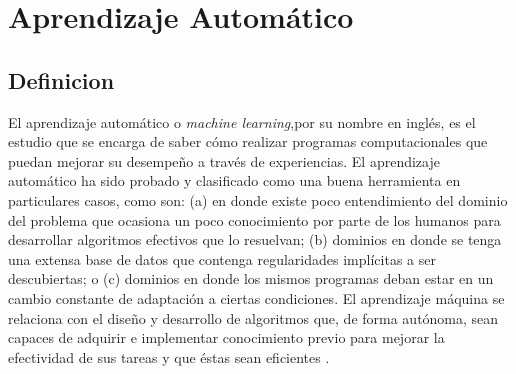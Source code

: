 \section{Aprendizaje Automático}

\subsection{Definicion}

El aprendizaje automático o \textit{machine learning},por su nombre en inglés, es el estudio que se encarga de saber cómo realizar programas computacionales que puedan mejorar su desempeño a través de experiencias. El aprendizaje automático ha sido probado y clasificado como una buena herramienta en particulares casos, como son: (a) en donde existe poco entendimiento del dominio del problema que ocasiona un poco conocimiento por parte de los humanos para desarrollar algoritmos efectivos que lo resuelvan; (b) dominios en donde se tenga una extensa base de datos que contenga regularidades implícitas a ser descubiertas; o (c) dominios en donde los mismos programas deban estar en un cambio constante de adaptación a ciertas condiciones. El aprendizaje máquina se relaciona con el diseño y desarrollo de algoritmos que, de forma autónoma, sean capaces de adquirir e implementar conocimiento previo para mejorar la efectividad de sus tareas y que éstas sean eficientes \cite{defmach}.\\